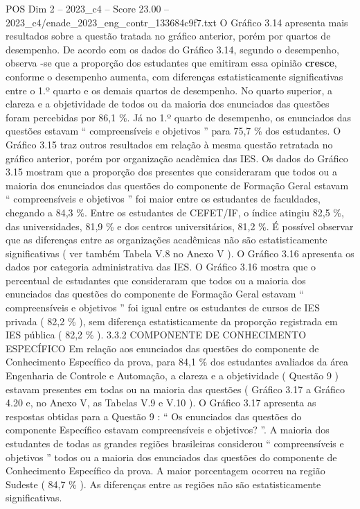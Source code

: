 \begin{textsample}{POS Dim 2 – 2023\_c4 – Score 23.00 – 2023\_c4/enade\_2023\_eng\_contr\_133684c9f7.txt}
O Gráfico 3.14 apresenta mais resultados sobre a questão tratada no gráfico anterior, porém por quartos de desempenho.
De acordo com os dados do Gráfico 3.14, segundo o desempenho, observa -se que a proporção dos estudantes que emitiram essa opinião \textbf{cresce}, conforme o desempenho aumenta, com diferenças estatisticamente significativas entre o 1.º quarto e os demais quartos de desempenho.
No quarto superior, a clareza e a objetividade de todos ou da maioria dos enunciados das questões foram percebidas por 86,1 \%.
Já no 1.º quarto de desempenho, os enunciados das questões estavam “ compreensíveis e objetivos ” para 75,7 \% dos estudantes.
O Gráfico 3.15 traz outros resultados em relação à mesma questão retratada no gráfico anterior, porém por organização acadêmica das IES.
Os dados do Gráfico 3.15 mostram que a proporção dos presentes que consideraram que todos ou a maioria dos enunciados das questões do componente de Formação Geral estavam “ compreensíveis e objetivos ” foi maior entre os estudantes de faculdades, chegando a 84,3 \%.
Entre os estudantes de CEFET/IF, o índice atingiu 82,5 \%, das universidades, 81,9 \% e dos centros universitários, 81,2 \%.
É possível observar que as diferenças entre as organizações acadêmicas não são estatisticamente significativas ( ver também Tabela V.8 no Anexo V ).
O Gráfico 3.16 apresenta os dados por categoria administrativa das IES.
O Gráfico 3.16 mostra que o percentual de estudantes que consideraram que todos ou a maioria dos enunciados das questões do componente de Formação Geral estavam “ compreensíveis e objetivos ” foi igual entre os estudantes de cursos de IES privada ( 82,2 \% ), sem diferença estatisticamente da proporção registrada em IES pública ( 82,2 \% ). 3.3.2 COMPONENTE DE CONHECIMENTO ESPECÍFICO Em relação aos enunciados das questões do componente de Conhecimento Específico da prova, para 84,1 \% dos estudantes avaliados da área Engenharia de Controle e Automação, a clareza e a objetividade ( Questão 9 ) estavam presentes em todas ou na maioria das questões ( Gráfico 3.17 a Gráfico 4.20 e, no Anexo V, as Tabelas V.9 e V.10 ).
O Gráfico 3.17 apresenta as respostas obtidas para a Questão 9 : “ Os enunciados das questões do componente Específico estavam compreensíveis e objetivos? ”.
A maioria dos estudantes de todas as grandes regiões brasileiras considerou “ compreensíveis e objetivos ” todos ou a maioria dos enunciados das questões do componente de Conhecimento Específico da prova.
A maior porcentagem ocorreu na região Sudeste ( 84,7 \% ).
As diferenças entre as regiões não são estatisticamente significativas.

\end{textsample}
